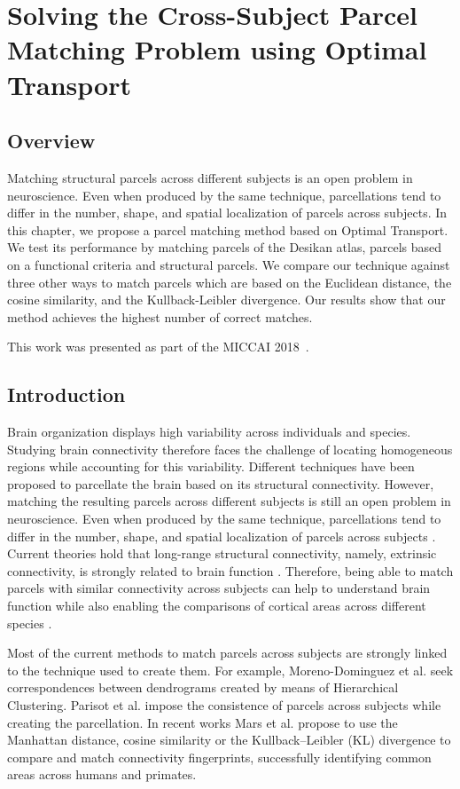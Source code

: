 \chapter{Solving the Cross-Subject Parcel Matching Problem using Optimal Transport}
%
\section{Overview}
Matching structural parcels across different subjects is an open problem in
neuroscience. Even when produced by the same technique, parcellations tend to
differ in the number, shape, and spatial localization of parcels across subjects.
In this chapter, we propose a parcel matching method based on Optimal Transport.
We test its performance by matching parcels of the Desikan atlas, parcels based
on a functional criteria and structural parcels. We compare our technique against
three other ways to match parcels which are based on the Euclidean distance, the
cosine similarity, and the Kullback-Leibler divergence. Our results show that
our method achieves the highest number of correct matches.

This work was presented as part of the MICCAI 2018~\cite{Gallardo2018}.

\section{Introduction}
Brain organization displays high variability across individuals and species. Studying brain connectivity therefore faces the challenge of locating homogeneous regions while accounting for this variability. Different techniques have been proposed to parcellate the brain based on its structural connectivity. However, matching the resulting parcels across different subjects is still an open problem in neuroscience. Even when produced by the same technique, parcellations tend to differ in the number, shape, and spatial localization of parcels across subjects \cite{Jbabdi2013}. Current theories hold that long-range structural connectivity, namely, extrinsic connectivity, is strongly related to brain function \cite{Passingham2002}. Therefore, being able to match parcels with similar connectivity across subjects can help to understand brain function while also enabling the comparisons of cortical areas across different species \cite{Mars2018}.

Most of the current methods to match parcels across subjects are strongly linked to the technique used to create them. For example, Moreno-Dominguez et al. \cite{Moreno-Dominguez2014} seek correspondences between dendrograms created by means of Hierarchical Clustering. Parisot et al. \cite{Paristot2015} impose the consistence of parcels across subjects while creating the parcellation. In recent works Mars et al. propose to use the Manhattan distance, cosine similarity \cite{Mars2016} or the Kullback–Leibler (KL) divergence \cite{Mars2018} to compare and match connectivity fingerprints, successfully identifying common areas across humans and primates.

